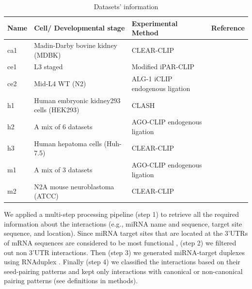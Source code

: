 \begin{table}[h!]
\caption{Datasets' information}
\label{tbl:dataset_description}
\begin{tabular}{|l|p{5cm}|p{4cm}|l|}
	\hline
	\textbf{Name} & \textbf{Cell/ Developmental stage} & \textbf{Experimental Method} & \textbf{Reference} \\
	\hline
	
    ca1 &
	Madin-Darby bovine kidney (MDBK) &
	CLEAR-CLIP                        
	& \cite{scheel2017global} \\
	\hline
	
    ce1 &
	L3 staged & 
	Modified iPAR-CLIP & 
	\cite{grosswendt2014unambiguous}  \\
	\hline

    ce2 &
	Mid-L4 WT (N2)  & 
	ALG-1 iCLIP endogenous ligation & 
	\cite{broughton2016pairing} \\
	\hline

    h1 &
	Human embryonic kidney293 cells (HEK293) & 
	CLASH  & 
	\cite{helwak2013mapping} \\
	\hline
	
    h2 &
	A mix of 6 datasets & 
	AGO-CLIP endogenous ligation &  
	\cite{grosswendt2014unambiguous} \\
	\hline
	
    h3 &
	Human hepatoma cells (Huh-7.5) & 
	CLEAR-CLIP & 
	\cite{darnell_moore2015mirna} \\
	\hline
	
    m1 &
	A mix of 3 datasets & 
	AGO-CLIP endogenous ligation & 
	\cite{grosswendt2014unambiguous} \\
	\hline
	
    m2 &
	N2A mouse neuroblastoma (ATCC) & 
	CLEAR-CLIP & 
	\cite{darnell_moore2015mirna} \\
	\hline
\end{tabular}
\end{table}



We applied a multi-step processing pipeline (step 1) to retrieve all the required information about the interactions (e.g., miRNA name and sequence, target site sequence, and location). Since miRNA target sites that are located at the 3'UTRs of mRNA sequences are considered to be most functional \cite{menor2014mirmark, baek2008impact}, (step 2) we filtered out non 3'UTR interactions. Then (step 3) we generated miRNA-target duplexes using RNAduplex \cite{lorenz2011viennarna}. Finally (step 4) we classified the interactions based on their seed-pairing patterns and kept only interactions with canonical or non-canonical pairing patterns (see definitions in methods). 


